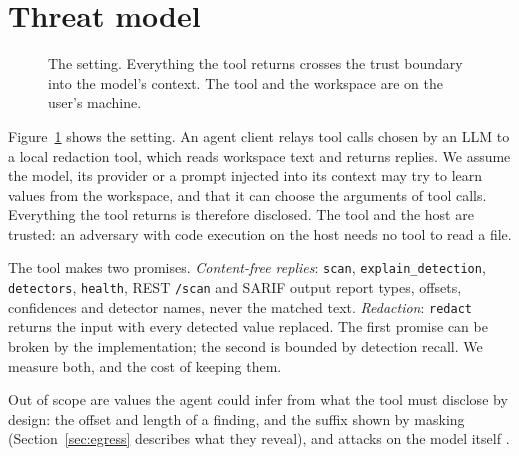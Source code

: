 \section{Threat model}\label{sec:threat}

\begin{figure}[t]
\centering
{}
\caption{The setting. Everything the tool returns crosses the trust boundary into the model's context. The tool and the workspace are on the user's machine.}\label{fig:topology}
\end{figure}

Figure~\ref{fig:topology} shows the setting. An agent client relays tool calls chosen by an LLM to a local redaction tool, which reads workspace text and returns replies. We assume the model, its provider or a prompt injected into its context \cite{greshake2023injection} may try to learn values from the workspace, and that it can choose the arguments of tool calls. Everything the tool returns is therefore disclosed. The tool and the host are trusted: an adversary with code execution on the host needs no tool to read a file.

The tool makes two promises. \emph{Content-free replies}: \texttt{scan}, \texttt{explain\_\allowbreak detection}, \texttt{detectors}, \texttt{health}, REST \texttt{/scan} and SARIF output report types, offsets, confidences and detector names, never the matched text. \emph{Redaction}: \texttt{redact} returns the input with every detected value replaced. The first promise can be broken by the implementation; the second is bounded by detection recall. We measure both, and the cost of keeping them.

Out of scope are values the agent could infer from what the tool must disclose by design: the offset and length of a finding, and the suffix shown by masking (Section~\ref{sec:egress} describes what they reveal), and attacks on the model itself \cite{carlini2021extracting,lukas2023pii}.
